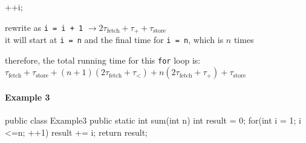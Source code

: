 \vspace{0.35cm}

\noindent
\begin{minipage}{0.15\textwidth}
    \begin{tightcode}
++i;
    \end{tightcode}
\end{minipage}
\begin{minipage}{0.75\textwidth} 
    rewrite as \texttt{i = i + 1} $\rightarrow 2\tau_{\text{fetch}} + \tau_{+} + \tau_{\text{store}}$\\
    it will start at \texttt{i = n} and the final time for \texttt{i = n}, which is $n$ times
\end{minipage}

\begin{center}
    therefore, the total running time for this \texttt{for} loop is:\\
    $\tau_{\text{fetch}} + \tau_{\text{store}} + (n+1)(2\tau_{\text{fetch}} + \tau_{<}) + n(2\tau_{\text{fetch}} + \tau_{+}) + \tau_{\text{store}}$
\end{center}

\paragraph*{Example 3}

\begin{center}
    \begin{minipage}{0.4\textwidth}
    \begin{tightcode}
public class Example3 {
    public static int sum(int n) {
        int result = 0;
        for(int i = 1; i <=n; ++1)
            result += i;
        return result;
    }
}
    \end{tightcode}
\end{minipage}
\end{center}

